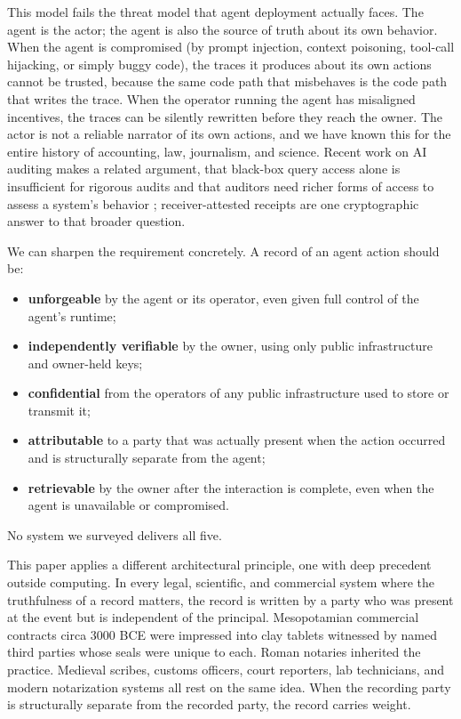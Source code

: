 \documentclass[
  11pt,
]{article}
\providecommand{\tightlist}{%
  \setlength{\itemsep}{0pt}\setlength{\parskip}{0pt}}
\begin{document}
This model fails the threat model that agent deployment actually faces.
The agent is the actor; the agent is also the source of truth about its
own behavior. When the agent is compromised (by prompt injection,
context poisoning, tool-call hijacking, or simply buggy code), the
traces it produces about its own actions cannot be trusted, because the
same code path that misbehaves is the code path that writes the trace.
When the operator running the agent has misaligned incentives, the
traces can be silently rewritten before they reach the owner. The actor
is not a reliable narrator of its own actions, and we have known this
for the entire history of accounting, law, journalism, and science.
Recent work on AI auditing makes a related argument, that black-box
query access alone is insufficient for rigorous audits and that auditors
need richer forms of access to assess a system's behavior
\citep{casper-blackbox}; receiver-attested receipts are one
cryptographic answer to that broader question.

We can sharpen the requirement concretely. A record of an agent action
should be:

\begin{itemize}
\tightlist
\item
  \textbf{unforgeable} by the agent or its operator, even given full
  control of the agent's runtime;
\item
  \textbf{independently verifiable} by the owner, using only public
  infrastructure and owner-held keys;
\item
  \textbf{confidential} from the operators of any public infrastructure
  used to store or transmit it;
\item
  \textbf{attributable} to a party that was actually present when the
  action occurred and is structurally separate from the agent;
\item
  \textbf{retrievable} by the owner after the interaction is complete,
  even when the agent is unavailable or compromised.
\end{itemize}

No system we surveyed delivers all five.

This paper applies a different architectural principle, one with deep
precedent outside computing. In every legal, scientific, and commercial
system where the truthfulness of a record matters, the record is written
by a party who was present at the event but is independent of the
principal. Mesopotamian commercial contracts circa 3000 BCE were
impressed into clay tablets witnessed by named third parties whose seals
were unique to each. Roman notaries inherited the practice. Medieval
scribes, customs officers, court reporters, lab technicians, and modern
notarization systems all rest on the same idea. When the recording party
is structurally separate from the recorded party, the record carries
weight.
\end{document}
